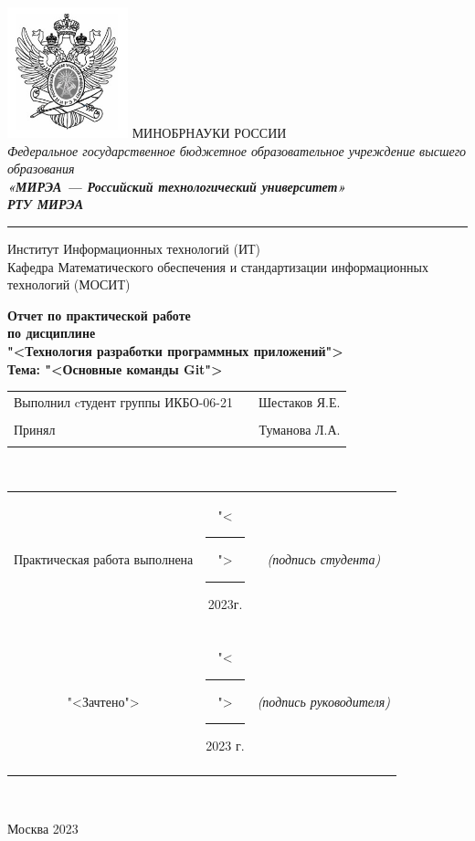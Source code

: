 \begin{center}
	\includegraphics[scale=0.5]{logo.png} \break %
	\normalsize{МИНОБРНАУКИ РОССИИ}\\
	\normalsize{\itshape Федеральное государственное бюджетное образовательное учреждение высшего образования}\\
	\normalsize{\bfseries\itshape«МИРЭА --- Российский технологический университет»}\\
	\large{\bfseries\itshape РТУ МИРЭА}\\
	\bigskip \hrule \smallskip
	\normalsize{Институт Информационных технологий (ИТ)}\\ \smallskip
	\normalsize{Кафедра Математического обеспечения и стандартизации информационных технологий (МОСИТ)}\\
	\hfill \break
	\hfill \break
	\begin{normalsize}
	  \textbf{
	    Отчет по практической работе \\
	    по дисциплине\\
	    "<Технология разработки программных приложений">\\
	    Тема: "<Основные команды Git">\\
	  }
	\end{normalsize}
	\hfill \break
	\hfill \break
	\hfill \break
	\begin{small}
		\begin{tabular}{lrr}
			Выполнил cтудент группы ИКБО-06-21 & & Шестаков Я.Е.\\\\
			Принял &  & Туманова Л.А.\\\\
		\end{tabular}
	\end{small}\\
	\smallskip
	\hfill \break
	\smallskip
	\begin{footnotesize}
		\begin{tabular}{ccc}
			Практическая  работа выполнена & "<\rule{1ex}{.5pt}">\rule{7ex}{.5pt}2023г. & \textit{(подпись студента)} \\\\
			"<Зачтено"> &  "<\rule{1ex}{.5pt}">\rule{7ex}{.5pt}2023 г. & \textit{(подпись руководителя)}\\\\
		\end{tabular}
	\end{footnotesize}\\
\end{center}

\begin{center} Москва 2023 \end{center}

\thispagestyle{empty}
